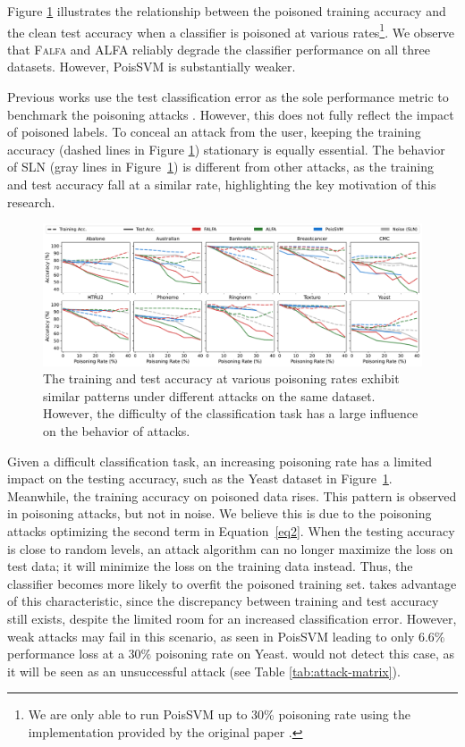 \documentclass[runningheads]{llncs}
\newcommand{\falfa}{\textsc{Falfa}\xspace}
\begin{document}
Figure \ref{fig.real_acc} illustrates the relationship between the poisoned training accuracy and the clean test accuracy when a classifier is poisoned at various rates\footnote{We are only able to run PoisSVM up to 30\% poisoning rate using the implementation provided by the original paper \cite{biggio2012poisoning}.}.
We observe that \falfa and ALFA reliably degrade the classifier performance on all three datasets. However, PoisSVM is substantially weaker.

Previous works use the test classification error as the sole performance metric to benchmark the poisoning attacks \cite{ho2002complexity,koh2022stronger,paudice2018label}.
However, this does not fully reflect the impact of poisoned labels.
To conceal an attack from the user, keeping the training accuracy (dashed lines in Figure \ref{fig.real_acc}) stationary is equally essential.
The behavior of SLN (gray lines in Figure~\ref{fig.real_acc}) is different from other attacks, as the training and test accuracy fall at a similar rate, highlighting the key motivation of this research.

\begin{figure}[ht!]
    \centering
    \includegraphics[width=\columnwidth]{images/flfa_acc_all.pdf}
    \caption[Training and Test Accuracy Under Poisoning Attacks]{
        The training and test accuracy at various poisoning rates exhibit similar patterns under different attacks on the same dataset. However, the difficulty of the classification task has a large influence on the behavior of attacks.
    }
    \label{fig.real_acc}
\end{figure}

Given a difficult classification task,
an increasing poisoning rate has a limited impact on the testing accuracy, such as the Yeast dataset in Figure~\ref{fig.real_acc}.
Meanwhile, the training accuracy on poisoned data rises.
This pattern is observed in poisoning attacks, but not in noise.
We believe this is due to the poisoning attacks optimizing the second term in Equation~\ref{eq2}.
When the testing accuracy is close to random levels, an attack algorithm can no longer maximize the loss on test data; it will minimize the loss on the training data instead.
Thus, the classifier becomes more likely to overfit the poisoned training set.
\diva takes advantage of this characteristic, since the discrepancy between training and test accuracy still exists, despite the limited room for an increased classification error.
However, weak attacks may fail in this scenario, as seen in PoisSVM leading to only $6.6\%$ performance loss at a $30\%$ poisoning rate on Yeast. \diva would not detect this case, as it will be seen as an unsuccessful attack (see Table \ref{tab:attack-matrix}).
\end{document}
